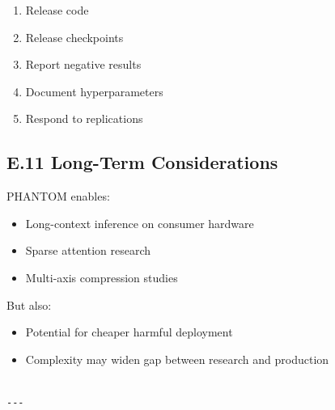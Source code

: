 \begin{enumerate}
\item Release code
\item Release checkpoints
\item Report negative results
\item Document hyperparameters
\item Respond to replications

\end{enumerate}
\subsection{E.11 Long-Term Considerations}

PHANTOM enables:
\begin{itemize}
\item Long-context inference on consumer hardware
\item Sparse attention research
\item Multi-axis compression studies

\end{itemize}
But also:
\begin{itemize}
\item Potential for cheaper harmful deployment
\item Complexity may widen gap between research and production
\end{itemize}
\begin{lstlisting}

---
\end{lstlisting}